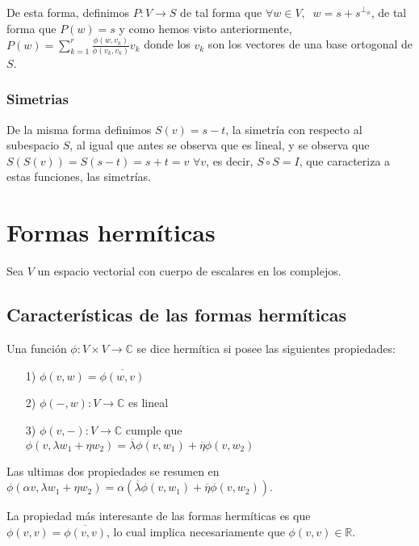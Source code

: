 \documentclass{preset}
\newcommand{\compconj}[1]{%
  \overline{#1}%
}
\begin{document}
De esta forma, definimos $P: V\rightarrow S$ de tal forma que $\forall w \in V, \;\; w= s+s^{\perp_\phi}$, de tal forma que $P(w)=s$ y como hemos visto anteriormente, $P(w)=\sum_{k=1}^{r}{\frac{\phi(w,v_k)}{\phi(v_k,v_k)} v_k}$ donde los $v_k$ son los vectores de una base ortogonal de $S$.

\vspace{-15pt}
\subsubsection{Simetrias}

De la misma forma definimos $S(v)= s-t$, la simetría con respecto al subespacio $S$, al igual que antes se observa que es lineal, y se observa que $S(S(v))=S(s-t)=s+t=v$ $\forall v$, es decir, $S \circ S = I$, que caracteriza a estas funciones, las simetrías.

\vspace{-30pt}
\section{Formas hermíticas}
Sea $V$ un espacio vectorial con cuerpo de escalares en los complejos.
\vspace{-15pt}
\subsection{Características de las formas hermíticas}
Una función $\phi:V\times V\rightarrow \mathbb{C}$ se dice hermítica si posee las siguientes propiedades:
\vspace{-10pt}
\begin{itemize}
	\item[1)] $\phi(v,w) = \compconj{\phi(w,v)}$
	\vspace{-10pt}
    \item[2)] $\phi(-,w): V \rightarrow \mathbb{C}$ es lineal
    \vspace{-10pt}
    \item[3)] $\phi(v,-): V \rightarrow \mathbb{C}$ cumple que $\phi(v,\lambda w_1 + \eta w_2)=\compconj{\lambda}\phi(v,w_1)+\compconj{\eta}\phi(v,w_2)$
\end{itemize}
Las ultimas dos propiedades se resumen en $\phi(\alpha v,\lambda w_1 + \eta w_2)=\alpha\left(\compconj{\lambda}\phi(v,w_1)+\compconj{\eta}\phi(v,w_2)\right)$.

\noindent La propiedad más interesante de las formas hermíticas es que $\phi(v,v)=\compconj{\phi(v,v)}$, lo cual implica necesariamente que $\phi(v,v)\in \mathbb{R}$.
\vspace{-15pt}
\end{document}
